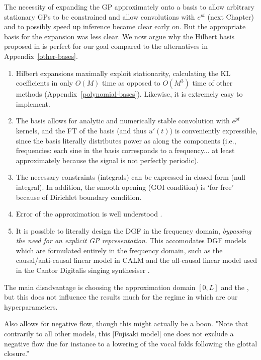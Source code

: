 \begin{chaptersections}
The necessity of expanding the GP approximately onto a basis to allow arbitrary stationary GPs to be constrained and allow convolutions with $e^{pt}$ (next Chapter) and to possibly speed up inference became clear early on.
But the appropriate basis for the expansion was less clear.
We now argue why the Hilbert basis proposed in \citep{Solin2020} is perfect for our goal compared to the alternatives in Appendix~\ref{other-bases}.
\begin{enumerate}
\item
Hilbert expansions maximally exploit stationarity, calculating the KL coefficients in only $O(M)$ time as opposed to $O(M^3)$ time of other methods (Appendix~\ref{polynomial-bases}).
Likewise, it is extremely easy to implement.
\item
The basis allows for analytic and numerically stable convolution with $e^{pt}$ kernels, and the FT of the basis (and thus $u'(t)$) is conveniently expressible, since the basis literally distributes power as along the components (i.e., frequencies: each sine in the basis corresponds to a frequency... at least approximately because the signal is not perfectly periodic).
\item
The necessary constraints (integrals) can be expressed in closed form (null integral).
In addition, the smooth opening (GOI condition) is `for free' because of Dirichlet boundary condition.
\item
Error of the approximation is well understood \citep[Section~4]{Solin2020}.
\item
It is possible to literally design the DGF in the frequency domain, \emph{bypassing the need for an explicit GP representation}.
This accomodates DGF models which are formulated entirely in the frequency domain, such as the causal/anti-causal linear model in CALM \citep{Doval2003} and the all-causal linear model used in the Cantor Digitalis singing synthesiser \citep{Feugere2017}.
\end{enumerate}

The main disadvantage is choosing the approximation domain $[0,L]$ and the \citep{Riutort-Mayol2020}, but this does not influence the results much for the regime in which are our hyperparameters.

Also allows for negative flow, though this might actually be a boon.
"Note that contrarily to all other models, this [Fujisaki model] one does not exclude a negative flow due for instance to a lowering of the vocal folds following the glottal closure.'' \citep[p.~35]{Degottex2010}


\end{chaptersections}
